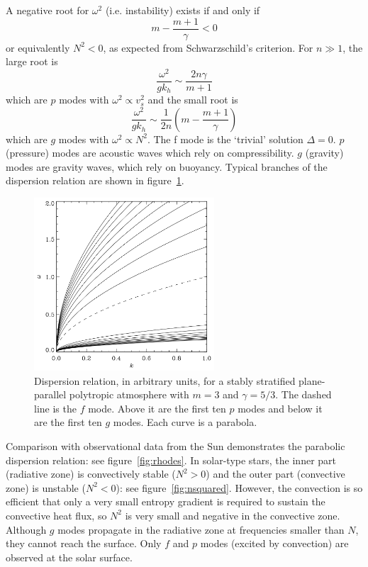 \documentclass{jknotes}
\begin{document}
A negative root for $\omega^2$ (i.e. instability) exists if and only if
\begin{equation}
	m - \frac{m+1}{\gamma} < 0
\end{equation}
or equivalently $N^2 < 0$, as expected from Schwarzschild's criterion. For $n
\gg 1$, the large root is
\begin{equation}
	\frac{\omega^2}{gk_h} \sim \frac{2n\gamma}{m+1}
\end{equation}
which are $p$ modes with $\omega^2 \propto v_s^2$ and the small root is
\begin{equation}
	\frac{\omega^2}{gk_h} \sim \frac{1}{2n}\left(m - \frac{m+1}{\gamma}\right)
\end{equation}
which are $g$ modes with $\omega^2 \propto N^2$. The f mode is the `trivial'
solution $\Delta = 0$. $p$ (pressure) modes are acoustic waves which rely on
compressibility. $g$ (gravity) modes are gravity waves, which rely on buoyancy.
Typical branches of the dispersion relation are shown in figure~\ref{fig:pgf}.

\begin{figure}[h]
	\centering
	\includegraphics[width=0.6\textwidth]{pgf_modes.png}
	\caption{Dispersion relation, in arbitrary units, for a stably stratified
	plane-parallel polytropic atmosphere with $m=3$ and $\gamma = 5/3$.
	The dashed line is the $f$ mode. Above it are the first ten $p$ modes
	and below it are the first ten $g$ modes. Each curve is a parabola.
	}
	\label{fig:pgf}
\end{figure}

Comparison with observational data from the Sun demonstrates the parabolic
dispersion relation: see figure~\ref{fig:rhodes}. In solar-type stars, the
inner part (radiative zone) is convectively stable ($N^2 > 0$) and the outer
part (convective zone) is unstable ($N^2 < 0$): see figure~\ref{fig:nsquared}.
However, the convection is so efficient that only a very small entropy
gradient is required to sustain the convective heat flux, so $N^2$ is very
small and negative in the convective zone. Although $g$ modes propagate in the
radiative zone  at frequencies smaller than $N$, they cannot reach the
surface. Only $f$ and $p$ modes (excited by convection) are observed at the
solar surface. 
\end{document}
